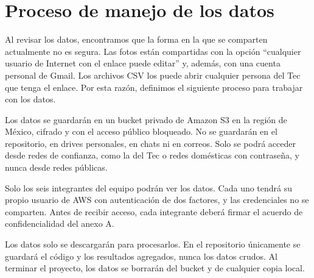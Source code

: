 \section{Proceso de manejo de los datos}

Al revisar los datos, encontramos que la forma en la que se comparten actualmente no es segura. Las fotos están compartidas con la opción “cualquier usuario de Internet con el enlace puede editar” y, además, con una cuenta personal de Gmail. Los archivos CSV los puede abrir cualquier persona del Tec que tenga el enlace. Por esta razón, definimos el siguiente proceso para trabajar con los datos.

Los datos se guardarán en un bucket privado de Amazon S3 en la región de México, cifrado y con el acceso público bloqueado. No se guardarán en el repositorio, en drives personales, en chats ni en correos. Solo se podrá acceder desde redes de confianza, como la del Tec o redes domésticas con contraseña, y nunca desde redes públicas.

Solo los seis integrantes del equipo podrán ver los datos. Cada uno tendrá su propio usuario de AWS con autenticación de dos factores, y las credenciales no se comparten. Antes de recibir acceso, cada integrante deberá firmar el acuerdo de confidencialidad del anexo A.

Los datos solo se descargarán para procesarlos. En el repositorio únicamente se guardará el código y los resultados agregados, nunca los datos crudos. Al terminar el proyecto, los datos se borrarán del bucket y de cualquier copia local.
